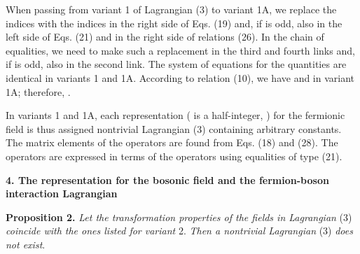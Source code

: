 \documentclass[a4paper,12pt]{article}
\begin{document}
When passing from variant 1 of Lagrangian (3) to variant 1A, we replace the
indices \myHighlight{$\pm$}\coordHE{} with the indices \myHighlight{$\mp$}\coordHE{} in the right side of Eqs. (19) and, if \coordHE{} 
is odd, also in the left side of Eqs. (21) and in the right side of relations
(26). In the chain of equalities, we need to make such a replacement in the
third and fourth links and, if \coordHE{} is odd, also in the second link. The system
of equations for the quantities \coordHE{} are identical in 
variants 1 and 1A. According to relation (10), we have \coordHE{} and 
\coordHE{} in variant 1A; therefore, \coordHE{}.

In variants 1 and 1A, each representation \coordHE{} (\coordHE{} is a
half-integer, \coordHE{}) for the fermionic field is thus assigned
nontrivial Lagrangian (3) containing \coordHE{} arbitrary constants. The 
matrix elements of the operators \coordHE{} are found from Eqs. (18) and (28).
The operators \coordHE{} are expressed in terms of the operators
\coordHE{} using equalities of type (21).

\begin{center}
{\large \bf 4. The representation \coordHE{} for the bosonic field and the
fermion-boson interaction Lagrangian}
\end{center}

{\bf Proposition 2.} {\it Let the transformation properties of the fields in 
Lagrangian} (3) {\it coincide with the ones listed for variant} 2. {\it Then a
nontrivial Lagrangian} (3) {\it does not exist}.
\end{document}

